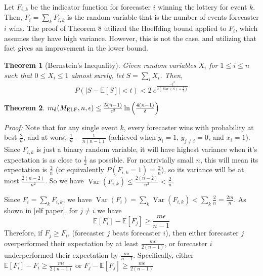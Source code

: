 \documentclass[letterpaper,12pt]{article}
\DeclareMathOperator*{\Var}{Var}
\newcommand{\E}{\mathbb{E}}
\newcommand{\1}{\mathbbm{1}}
\newtheorem{theorem}{Theorem}
\begin{document}
Let $F_{i, k}$ be the indicator function for forecaster $i$ winning the lottery for event $k$. Then, $F_i = \sum_k F_{i, k}$ is the random variable that is the number of events forecaster $i$ wins. The proof of Theorem 8 \cite{elf} utilized the Hoeffding bound applied to $F_i$, which assumes they have high variance. However, this is not the case, and utilizing that fact gives an improvement in the lower bound. 
\begin{theorem}[Bernstein's Inequality]
  \label{bernstein}
  Given random variables $X_i$ for $1 \leq i \leq n$ such that $0 \leq X_i \leq 1$ almost surely, let $S = \sum_i X_i$. Then,
  \[ P\left(|S - \E[S]| < t\right) < 2 \: e^{\frac{-t^2 }{2\left(\Var(S) + \frac{t}{3}\right)} } \]
\end{theorem}
\begin{theorem}
  \label{elf_bound}
    $m_\delta(M_{\mathrm{ELF}}, n, \epsilon) \leq \frac{5(n-1)}{\epsilon^2}\ln\left(\frac{4(n-1)}{\delta}\right)$
\end{theorem}
\emph{Proof:} Note that for any single event $k$, every forecaster wins with probability at best $\frac{2}{n}$, and at worst $\frac{1}{n} - \frac{1}{n(n-1)}$ (achieved when $y_i = 1$, $y_{j\neq i} = 0$, and $x_i = 1$). Since $F_{i, k}$ is just a binary random variable, it will have highest variance when it's expectation is as close to $\frac{1}{2}$ as possible. For nontrivially small $n$, this will mean its expectation is $\frac{2}{n}$ (or equivalently $P(F_{i, k} = 1) = \frac{2}{n}$), so its variance will be at most $\frac{2(n-2)}{n^2}$. So we have $\Var(F_{i, k}) \leq \frac{2(n-2)}{n^2} < \frac{2}{n}$. 

Since $F_i = \sum_k F_{i, k}$, we have $\Var(F_i) = \sum_k \Var(F_{i, k}) < \sum_k \frac{2}{n} = \frac{2m}{n}$. As shown in [elf paper], for $j\neq i$ we have 
\[ \E[F_i] - \E[F_j] \geq \frac{m \epsilon}{n - 1}\]
Therefore, if $F_j \geq F_i$, (forecaster $j$ beats forecaster $i$), then either forecaster $j$ overperformed their expectation by at least $\frac{m \epsilon}{2(n - 1)}$, or forecaster $i$ underperformed their expectation by $\frac{m \epsilon}{n - 1}$. Specifically, either $\E[F_i] - F_i \geq \frac{m \epsilon}{2(n - 1)}$ or $F_j - \E[F_j] \geq \frac{m \epsilon}{2(n - 1)}$
\end{document}
